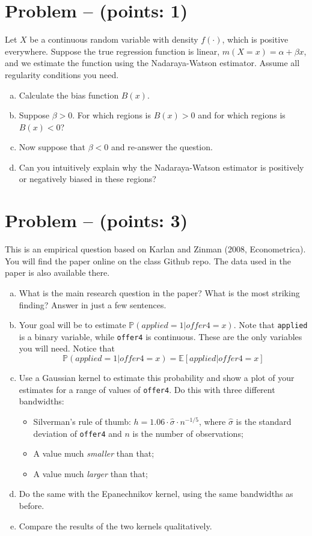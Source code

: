 \documentclass[11pt]{article}
\theoremstyle{definition}
\newcounter{problem}
\renewcommand{\theproblem}{\arabic{problem}}
\newcommand{\problem}[1]{
	\stepcounter{problem}
	\section*{Problem \theproblem{} -- (points: #1)}
}
\begin{document}
\problem{1}
Let $X$ be a continuous random variable with density $f(\cdot)$, which is positive everywhere. Suppose the true regression function is linear, \( m(X = x) = \alpha + \beta x \), and we estimate the function using the Nadaraya-Watson estimator. Assume all regularity conditions you need.

\begin{enumerate}[a)]
	\item Calculate the bias function \( B(x) \).
	\item Suppose \( \beta > 0 \). For which regions is \( B(x) > 0 \) and for which regions is \( B(x) < 0 \)?
	\item Now suppose that \( \beta < 0 \) and re-answer the question.
	\item Can you intuitively explain why the Nadaraya-Watson estimator is positively or negatively biased in these regions?
\end{enumerate}

\problem{3}
This is an empirical question based on Karlan and Zinman (2008, Econometrica). You will find the paper online on the class Github repo. The data used in the paper is also available there.

\begin{enumerate}[a)]
	\item What is the main research question in the paper? What is the most striking finding? Answer in just a few sentences.
	\item Your goal will be to estimate $\mathbb{P}(applied = 1 | offer4 = x)$. Note that \texttt{applied} is a binary variable, while \texttt{offer4} is continuous. These are the only variables you will need. Notice that 
	\[
	\mathbb{P}(applied = 1 | offer4 = x) = \mathbb{E}[applied | offer4 = x]
	\]

	\item Use a Gaussian kernel to estimate this probability and show a plot of your estimates for a range of values of \texttt{offer4}. Do this with three different bandwidths: 
	\begin{itemize}
		\item Silverman’s rule of thumb: $h = 1.06 \cdot \hat{\sigma} \cdot n^{-1/5}$, where $\hat{\sigma}$ is the standard deviation of \texttt{offer4} and $n$ is the number of observations;
		\item A value much \textit{smaller} than that;
		\item A value much \textit{larger} than that;
	\end{itemize}
	\item Do the same with the Epanechnikov kernel, using the same bandwidths as before.
	\item Compare the results of the two kernels qualitatively.
\end{enumerate}
\end{document}
